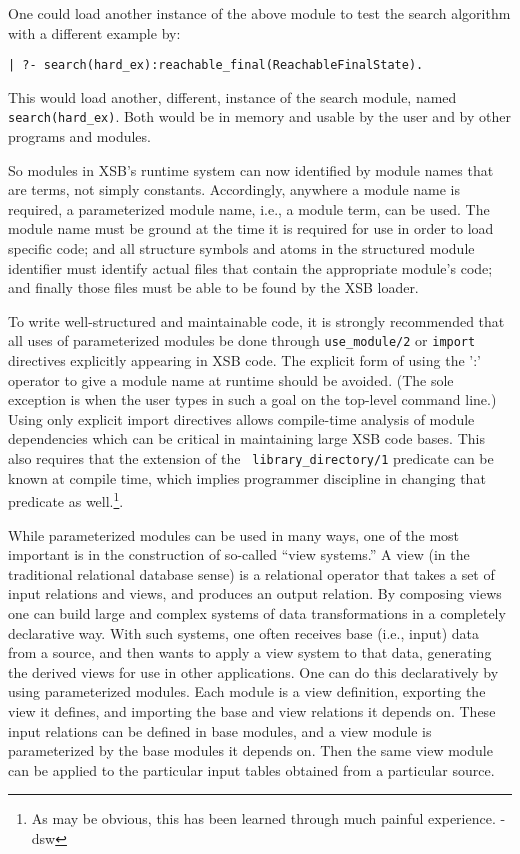 One could load another instance of the above module to test the search
algorithm with a different example by:
\begin{verbatim}
| ?- search(hard_ex):reachable_final(ReachableFinalState).
\end{verbatim}
This would load another, different, instance of the search module,
named {\tt search(hard\_ex)}.  Both would be in memory and usable by
the user and by other programs and modules.

So modules in XSB's runtime system can now identified by module names
that are terms, not simply constants. Accordingly, anywhere a module
name is required, a parameterized module name, i.e., a module term,
can be used.  The module name must be ground at the time it is
required for use in order to load specific code; and all structure
symbols and atoms in the structured module identifier must identify
actual files that contain the appropriate module's code; and finally
those files must be able to be found by the XSB loader.

To write well-structured and maintainable code, it is strongly
recommended that all uses of parameterized modules be done through
{\tt use\_module/2} or {\tt import} directives explicitly appearing in
XSB code.  The explicit form of using the ':' operator to give a
module name at runtime should be avoided.  (The sole exception is when
the user types in such a goal on the top-level command line.)  Using
only explicit import directives allows compile-time analysis of module
dependencies which can be critical in maintaining large XSB code
bases. This also requires that the extension of the {\tt
  library\_directory/1} predicate can be known at compile time, which
implies programmer discipline in changing that predicate as
well.\footnote{As may be obvious, this has been learned through much
  painful experience. -dsw}.

While parameterized modules can be used in many ways, one of the most
important is in the construction of so-called ``view systems.''  A view
(in the traditional relational database sense) is a relational
operator that takes a set of input relations and views, and produces
an output relation.  By composing views one can build large and
complex systems of data transformations in a completely declarative
way.  With such systems, one often receives base (i.e., input) data
from a source, and then wants to apply a view system to that data,
generating the derived views for use in other applications.  One can
do this declaratively by using parameterized modules.  Each module is
a view definition, exporting the view it defines, and importing the
base and view relations it depends on.  These input relations can be
defined in base modules, and a view module is parameterized by the
base modules it depends on.  Then the same view module can be applied
to the particular input tables obtained from a particular source.





